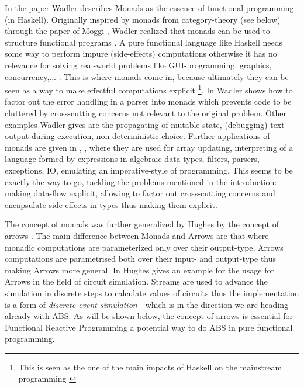 In the paper \cite{wadler_essence_1992} Wadler describes Monads as the essence of functional programming (in Haskell). Originally inspired by monads from category-theory (see below) through the paper of Moggi \cite{moggi_computational_1989}, Wadler realized that monads can be used to structure functional programs \cite{wadler_comprehending_1990}. A pure functional language like Haskell needs some way to perform impure (side-effects) computations otherwise it has no relevance for solving real-world problems like GUI-programming, graphics, concurrency,... . This is where monads come in, because ultimately they can be seen as a way to make effectful computations explicit \footnote{This is seen as the one of the main impacts of Haskell on the mainstream programming \cite{hudak_history_2007}}. 
In \cite{wadler_essence_1992} Wadler shows how to factor out the error handling in a parser into monads which prevents code to be cluttered by cross-cutting concerns not relevant to the original problem. Other examples Wadler gives are the propagating of mutable state, (debugging) text-output during execution, non-deterministic choice. Further applications of monads are given in \cite{wadler_essence_1992}, \cite{wadler_monads_1995}, \cite{wadler_how_1997} where they are used for array updating, interpreting of a language formed by expressions in algebraic data-types, filters, parsers, exceptions, IO, emulating an imperative-style of programming. This seems to be exactly the way to go, tackling the problems mentioned in the introduction: making data-flow explicit, allowing to factor out cross-cutting concerns and encapsulate side-effects in types thus making them explicit.

The concept of monads was further generalized by Hughes by the concept of arrows \cite{hughes_generalising_2000}. The main difference between Monads and Arrows are that where monadic computations are parameterized only over their output-type, Arrows computations are parametrised both over their input- and output-type thus making Arrows more general. In \cite{hughes_programming_2005} Hughes gives an example for the usage for Arrows in the field of circuit simulation. Streams are used to advance the simulation in discrete steps to calculate values of circuits thus the implementation is a form of \textit{discrete event simulation} - which is in the direction we are heading already with ABS. As will be shown below, the concept of arrows is essential for Functional Reactive Programming a potential way to do ABS in pure functional programming.

